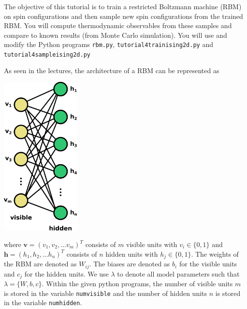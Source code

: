 \documentclass[letterpaper]{scrartcl}
\begin{document}

\vspace{-3cm}


\date{August 30, 2019}

\maketitle

The objective of this tutorial is to train a restricted Boltzmann machine (RBM) on spin configurations 
and then sample new spin configurations from the trained RBM. 
You will compute thermodynamic observables from these samples and compare to known results (from Monte Carlo simulation).
You will use and modify the Python programs 
\texttt{rbm.py}, \texttt{tutorial4{\textunderscore}train{\textunderscore}ising2d.py} and 
\texttt{tutorial4{\textunderscore}sample{\textunderscore}ising2d.py} %

As seen in the lectures, the architecture of a RBM can be represented as
\begin{center}
\includegraphics[width=4cm]{RBM.pdf}
\end{center}
where $\mathbf{v} = \left(v_1, v_2, \ldots v_m\right)^T$ consists of $m$ visible units with $v_i \in \{0,1\}$ and $\mathbf{h} = \left(h_1, h_2, \ldots h_n\right)^T$ consists of $n$ hidden units with $h_j \in \{0,1\}$.
The weights of the RBM are denoted as $W_{ij}$. 
The biases are denoted as $b_i$ for the visible units and $c_j$ for the hidden units.
We use $\lambda$ to denote all model parameters such that $\lambda = \{ W, b, c \}$.
Within the given python programs, the number of visible units $m$ is stored in the variable \texttt{num{\textunderscore}visible}
and the number of hidden units $n$ is stored in the variable \texttt{num{\textunderscore}hidden}.
\end{document}
